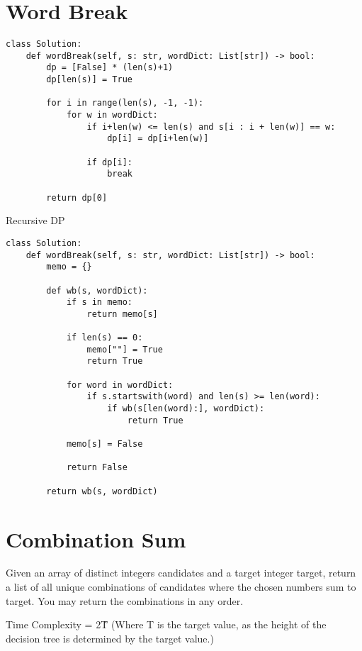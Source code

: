 \documentclass[24pt, a4]{article}
\begin{document}
\section{Word Break}
\begin{lstlisting}
class Solution:
    def wordBreak(self, s: str, wordDict: List[str]) -> bool:
        dp = [False] * (len(s)+1)
        dp[len(s)] = True
        
        for i in range(len(s), -1, -1):
            for w in wordDict:
                if i+len(w) <= len(s) and s[i : i + len(w)] == w:
                    dp[i] = dp[i+len(w)]
                
                if dp[i]:
                    break
        
        return dp[0]
\end{lstlisting}

Recursive DP
\begin{lstlisting}
class Solution:
    def wordBreak(self, s: str, wordDict: List[str]) -> bool:
        memo = {}
        
        def wb(s, wordDict):
            if s in memo:
                return memo[s]
            
            if len(s) == 0:
                memo[""] = True
                return True
            
            for word in wordDict:
                if s.startswith(word) and len(s) >= len(word):
                    if wb(s[len(word):], wordDict):
                        return True
            
            memo[s] = False
            
            return False
        
        return wb(s, wordDict)
\end{lstlisting}

\section{Combination Sum}

Given an array of distinct integers candidates and a target integer target, return a list of all unique combinations of candidates where the chosen numbers sum to target. You may return the combinations in any order.

Time Complexity = 2\^T (Where T is the target value, as the height of the decision tree is determined by the target value.)
\end{document}

